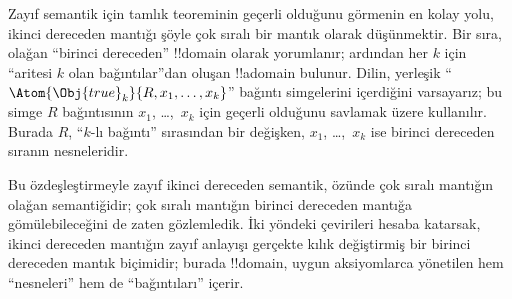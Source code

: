 Zayıf semantik için tamlık teoreminin geçerli olduğunu görmenin en kolay yolu,
ikinci dereceden mantığı şöyle çok sıralı bir mantık olarak düşünmektir. Bir
sıra, olağan ``birinci dereceden'' !!{domain} olarak yorumlanır; ardından her
$k$ için ``aritesi $k$ olan bağıntılar''dan oluşan !!a{domain} bulunur. Dilin,
yerleşik ``$\Atom{\Obj{true}_k}{R,x_1,\dots,x_k}$'' bağıntı simgelerini
içerdiğini varsayarız; bu simge $R$ bağıntısının $x_1$, \dots,~$x_k$ için geçerli
olduğunu savlamak üzere kullanılır. Burada $R$, ``$k$-lı bağıntı'' sırasından
bir değişken, $x_1$, \dots,~$x_k$ ise birinci dereceden sıranın nesneleridir.

Bu özdeşleştirmeyle zayıf ikinci dereceden semantik, özünde çok sıralı mantığın
olağan semantiğidir; çok sıralı mantığın birinci dereceden mantığa
gömülebileceğini de zaten gözlemledik. İki yöndeki çevirileri hesaba katarsak,
ikinci dereceden mantığın zayıf anlayışı gerçekte kılık değiştirmiş bir birinci
dereceden mantık biçimidir; burada !!{domain}, uygun aksiyomlarca yönetilen hem
``nesneleri'' hem de ``bağıntıları'' içerir.

